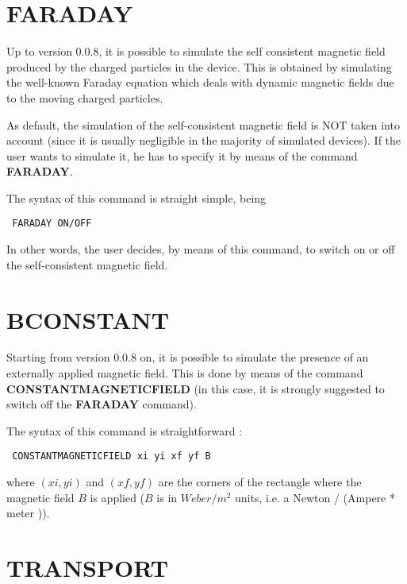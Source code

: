 \documentclass[12pt]{book}
\begin{document}
\section{FARADAY}
Up to version 0.0.8, it is possible to simulate the self consistent magnetic field produced by the charged particles in the device. This is obtained by simulating the well-known Faraday equation which deals with dynamic magnetic fields due to the moving charged particles.

As default, the simulation of the self-consistent magnetic field is NOT taken into account (since it is usually negligible in the majority of simulated devices). If the user wants to simulate it, he has to specify it by means of the command \textbf{FARADAY}.

The syntax of this command is straight simple, being
\begin{verbatim}
 FARADAY ON/OFF
\end{verbatim}
In other words, the user decides, by means of this command, to switch on or off the self-consistent magnetic field.

\section{BCONSTANT}
Starting from version 0.0.8 on, it is possible to simulate the presence of an externally applied magnetic field. This is done by means of the command \textbf{CONSTANTMAGNETICFIELD} (in this case, it is strongly suggested to switch off the \textbf{FARADAY} command).

The syntax of this command is straightforward :
\begin{verbatim}
 CONSTANTMAGNETICFIELD xi yi xf yf B
\end{verbatim}
where $(xi,yi)$ and $(xf,yf)$ are the corners of the rectangle where the magnetic field $B$ is applied ($B$ is in $Weber/m^2$ units, i.e. a Newton / (Ampere * meter )).

\section{TRANSPORT}
\end{document}
